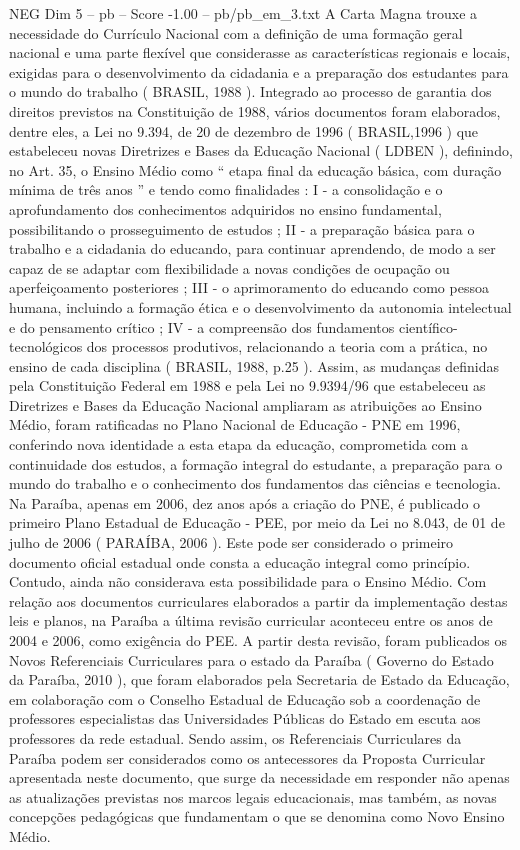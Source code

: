 \begin{textsample}{NEG Dim 5 – pb – Score -1.00 – pb/pb\_em\_3.txt}
A Carta Magna trouxe a necessidade do Currículo Nacional com a definição de uma formação geral nacional e uma parte flexível que considerasse as características regionais e locais, exigidas para o desenvolvimento da cidadania e a preparação dos estudantes para o mundo do trabalho ( BRASIL, 1988 ).
Integrado ao processo de garantia dos direitos previstos na Constituição de 1988, vários documentos foram elaborados, dentre eles, a Lei no 9.394, de 20 de dezembro de 1996 ( BRASIL,1996 ) que estabeleceu novas Diretrizes e Bases da Educação Nacional ( LDBEN ), definindo, no Art. 35, o Ensino Médio como “ etapa final da educação básica, com duração mínima de três anos ” e tendo como finalidades : I - a consolidação e o aprofundamento dos conhecimentos adquiridos no ensino fundamental, possibilitando o prosseguimento de estudos ; II - a preparação básica para o trabalho e a cidadania do educando, para continuar aprendendo, de modo a ser capaz de se adaptar com flexibilidade a novas condições de ocupação ou aperfeiçoamento posteriores ; III - o aprimoramento do educando como pessoa humana, incluindo a formação ética e o desenvolvimento da autonomia intelectual e do pensamento crítico ; IV - a compreensão dos fundamentos científico-tecnológicos dos processos produtivos, relacionando a teoria com a prática, no ensino de cada disciplina ( BRASIL, 1988, p.25 ).
Assim, as mudanças definidas pela Constituição Federal em 1988 e pela Lei no 9.9394/96 que estabeleceu as Diretrizes e Bases da Educação Nacional ampliaram as atribuições ao Ensino Médio, foram ratificadas no Plano Nacional de Educação - PNE em 1996, conferindo nova identidade a esta etapa da educação, comprometida com a continuidade dos estudos, a formação integral do estudante, a preparação para o mundo do trabalho e o conhecimento dos fundamentos das ciências e tecnologia.
Na Paraíba, apenas em 2006, dez anos após a criação do PNE, é publicado o primeiro Plano Estadual de Educação - PEE, por meio da Lei no 8.043, de 01 de julho de 2006 ( PARAÍBA, 2006 ).
Este pode ser considerado o primeiro documento oficial estadual onde consta a educação integral como princípio.
Contudo, ainda não considerava esta possibilidade para o Ensino Médio.
Com relação aos documentos curriculares elaborados a partir da implementação destas leis e planos, na Paraíba a última revisão curricular aconteceu entre os anos de 2004 e 2006, como exigência do PEE.
A partir desta revisão, foram publicados os Novos Referenciais Curriculares para o estado da Paraíba ( Governo do Estado da Paraíba, 2010 ), que foram elaborados pela Secretaria de Estado da Educação, em colaboração com o Conselho Estadual de Educação sob a coordenação de professores especialistas das Universidades Públicas do Estado em escuta aos professores da rede estadual.
Sendo assim, os Referenciais Curriculares da Paraíba podem ser considerados como os antecessores da Proposta Curricular apresentada neste documento, que surge da necessidade em responder não apenas as atualizações previstas nos marcos legais educacionais, mas também, as novas concepções pedagógicas que fundamentam o que se denomina como Novo Ensino Médio.

\end{textsample}
